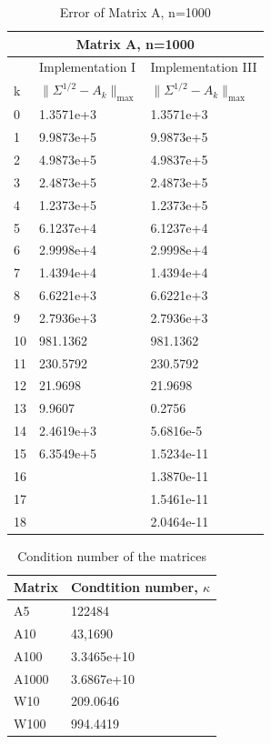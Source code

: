 \begin{table}
\begin{center}
\label{Table: A1000}
\begin{tabular}{| l | l | l | }

	\hline
	\multicolumn{3}{|c|}{Matrix A, n=1000}  \\
	\hline
	   & Implementation I & Implementation III \\
	k & $\parallel \Sigma^{1/2} - A_{k}\parallel_{\text{max}}$ & $\parallel \Sigma^{1/2} - A_{k}\parallel_{\text{max}}$  \\	
	\hline
	0 & 1.3571e+3 & 1.3571e+3\\
	1& 9.9873e+5 & 9.9873e+5 \\
	2 &  4.9873e+5& 4.9837e+5 \\
	3 & 2.4873e+5&  2.4873e+5\\
	4 & 1.2373e+5&  1.2373e+5  \\
	5 & 6.1237e+4& 6.1237e+4\\
	6 & 2.9998e+4& 2.9998e+4 \\
	7 & 1.4394e+4& 1.4394e+4 \\
	8 & 6.6221e+3& 6.6221e+3  \\
	9 & 2.7936e+3& 2.7936e+3 \\
	10 & 981.1362& 981.1362 \\
	11 & 230.5792& 230.5792 \\
	12& 21.9698& 21.9698\\ 
	13& 9.9607&0.2756\\
	14&2.4619e+3& 5.6816e-5 \\
	15&6.3549e+5& 1.5234e-11 \\
	16& & 1.3870e-11\\
	17& & 1.5461e-11\\
	18& & 2.0464e-11\\
	
	\hline
	
\end{tabular}
\caption{Error of Matrix A, n=1000}
\end{center}
\end{table}


\begin{table}
\label{Table: Kondisjons tall}
\begin{center}
\begin{tabular}{| l | l | }

	
	\hline
	Matrix & Condtition number, $\kappa$\\	
	\hline
	A5 & 122484  \\
	A10 & 43,1690 \\
	A100 &3.3465e+10  \\
	A1000 & 3.6867e+10 \\
	W10 & 209.0646 \\
	W100 & 994.4419 \\
	
	\hline
	
\end{tabular}
\caption{Condition number of the matrices}
\end{center}
\end{table}



